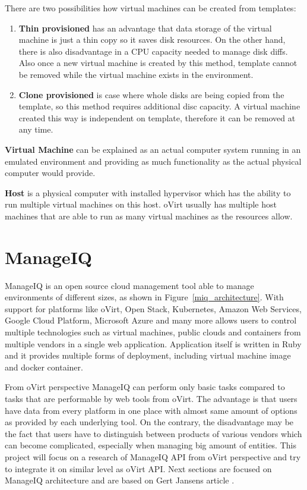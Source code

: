 \noindent There are two possibilities how virtual machines can be created from templates: 
\begin{enumerate}

\item \textbf{Thin provisioned} has an advantage that data storage of the virtual machine is just a thin copy so it saves disk resources. On the other hand, there is also disadvantage in a CPU capacity needed to manage disk diffs. Also once a new virtual machine is created by this method, template cannot be removed while the virtual machine exists in the environment. 

\item \textbf{Clone provisioned} is case where whole disks are being copied from the template, so this method requires additional disc capacity. A virtual machine created this way is independent on template, therefore it can be removed at any time. 
\end{enumerate} 

\textbf{Virtual Machine} can be explained as an actual computer system running in an emulated environment and providing as much functionality as the actual physical computer would provide.

\textbf{Host} is a physical computer with installed hypervisor which has the ability to run multiple virtual machines on this host. oVirt usually has multiple host machines that are able to run as many virtual machines as the resources allow.

\chapter{ManageIQ}\label{MIQ}
ManageIQ is an open source cloud management tool able to manage environments of different sizes, as shown in Figure~\ref{miq_architecture}. With support for platforms like oVirt, Open Stack, Kubernetes, Amazon Web Services, Google Cloud Platform, Microsoft Azure and many more allows users to control multiple technologies such as virtual machines, public clouds and containers from multiple vendors in a single web application.
Application itself is written in Ruby and it provides multiple forms of deployment, including virtual machine image and docker container. 

From oVirt perspective ManageIQ can perform only basic tasks compared to tasks that are performable by web tools from oVirt. The advantage is that users have data from every platform in one place with almost same amount of options as provided by each underlying tool. On the contrary, the disadvantage may be the fact that users have to distinguish between products of various vendors which can become complicated, especially when managing big amount of entities. This project will focus on a research of ManageIQ API from oVirt perspective and try to integrate it on similar level as oVirt API.
Next sections are focused on ManageIQ architecture and are based on Gert Jansens article \cite{ManageIQarchitecture}.

